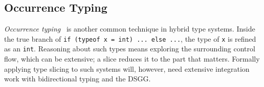 \subsection{Occurrence Typing}
\label{sec:occurrence}

\emph{Occurrence typing}~\cite{OccurrenceTyping} is another common technique in hybrid type systems. Inside the true branch of \texttt{if (typeof x = int) ... else ...}, the type of \texttt{x} is refined as an \texttt{int}. Reasoning about such types means exploring the surrounding control flow, which can be extensive; a slice reduces it to the part that matters. Formally applying type slicing to such systems will, however, need extensive integration work with bidirectional typing and the DSGG.

